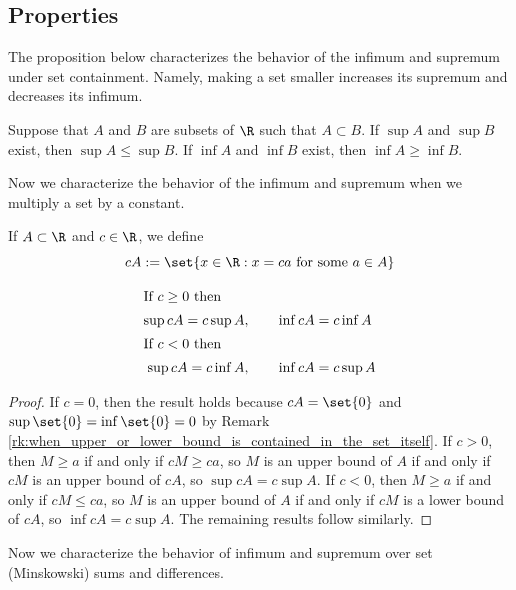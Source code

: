 \documentclass{article} %
\begin{document}
\subsection{Properties}

The proposition below characterizes the behavior of the infimum and supremum under set containment. Namely, making a set smaller increases its supremum and decreases its infimum. 

\begin{proposition}
Suppose that $A$ and $B$ are subsets of $\R$ such that $A \subset B$.  If $\sup A$ and $\sup B$ exist, then $\sup A \leq \sup B$.  If $\inf A$ and $\inf B$ exist, then $\inf A \geq \inf B$.
\label{prop:sup_and_inf_for_subsets_are_tighter}
\end{proposition}

Now we characterize the behavior of the infimum and supremum when we multiply a set by a constant.

\begin{definition}
If $A \subset \R$ and $c \in \R$, we define
\[ cA := \set{x \in \R : x = ca \text{ for some } a \in A}\]	
\end{definition}

\begin{proposition}

\begin{align*}
\intertext{If $c \geq 0$ then} 
\sup cA = c \sup A, &\quad \quad \inf cA = c \inf A\\
\intertext{If $c < 0$ then} 
\sup cA = c \inf A, &\quad \quad \inf cA = c \sup A
\end{align*}
\label{prop:supremum_and_infimum_under_constant_multiples_of_sets}
\end{proposition}

\begin{proof}
If $c=0$, then the result holds because $cA = \set{0}$ and $\sup \set{0} = \inf \set{0} = 0$ by Remark \ref{rk:when_upper_or_lower_bound_is_contained_in_the_set_itself}.	If $c >0$, then $M \geq a$ if and only if $cM \geq ca$, so $M$ is an upper bound of $A$ if and only if $cM$ is an upper bound of $cA$, so $\sup cA = c \sup A$.   If $c<0$, then $M \geq a$ if and only if $cM \leq ca$, so $M$ is an upper bound of $A$ if and only if $cM$ is a lower bound of $cA$, so $\inf cA = c \sup A$.  The remaining results follow similarly. 
\end{proof}


Now we characterize the behavior of infimum and supremum over set (Minskowski) sums and differences.
\end{document}
